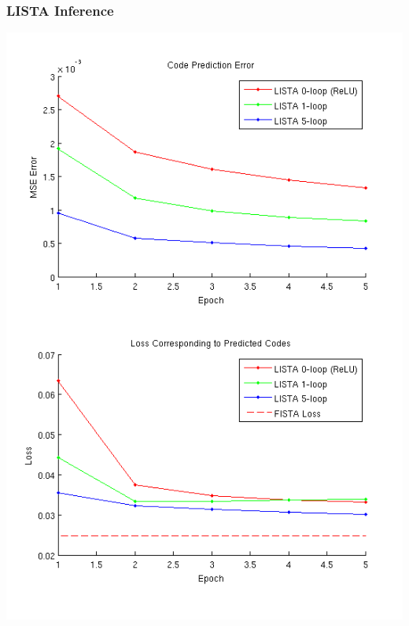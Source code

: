 \documentclass{beamer}
\begin{document}
\begin{frame}
\frametitle{LISTA Inference} 
\centerline{\includegraphics[scale=0.35]{./images/LISTA/code_pred.png}}
\end{frame} 
\end{document}
